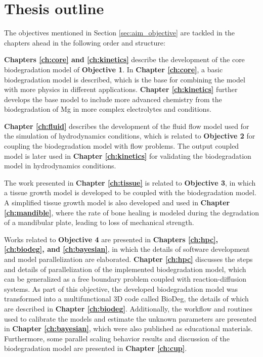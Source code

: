 \section{Thesis outline}

The objectives mentioned in Section \ref{sec:aim_objective} are tackled in the chapters ahead in the following order and structure:

\textbf{Chapters \ref{ch:core} and \ref{ch:kinetics}} describe the development of the core biodegradation model of \textbf{Objective 1}. In \textbf{Chapter \ref{ch:core}}, a basic biodegradation model is described, which is the base for combining the model with more physics in different applications. \textbf{Chapter \ref{ch:kinetics}} further develops the base model to include more advanced chemistry from the biodegradation of Mg in more complex electrolytes and conditions.

\textbf{Chapter \ref{ch:fluid}} describes the development of the fluid flow model used for the simulation of hydrodynamics conditions, which is related to \textbf{Objective 2} for coupling the biodegradation model with flow problems. The output coupled model is later used in \textbf{Chapter \ref{ch:kinetics}} for validating the biodegradation model in hydrodynamics conditions.

The work presented in \textbf{Chapter \ref{ch:tissue}} is related to \textbf{Objective 3}, in which a tissue growth model is developed to be coupled with the biodegradation model. A simplified tissue growth model is also developed and used in \textbf{Chapter \ref{ch:mandible}}, where the rate of bone healing is modeled during the degradation of a mandibular plate, leading to loss of mechanical strength.

Works related to \textbf{Objective 4} are presented in \textbf{Chapters \ref{ch:hpc}, \ref{ch:biodeg}, and \ref{ch:bayesian}}, in which the details of software development and model parallelization are elaborated. \textbf{Chapter \ref{ch:hpc}} discusses the steps and details of parallelization of the implemented biodegradation model, which can be generalized as a free boundary problem coupled with reaction-diffusion systems. As part of this objective, the developed biodegradation model was transformed into a multifunctional 3D code called BioDeg, the details of which are described in \textbf{Chapter \ref{ch:biodeg}}. Additionally, the workflow and routines used to calibrate the models and estimate the unknown parameters are presented in \textbf{Chapter \ref{ch:bayesian}}, which were also published as educational materials. Furthermore, some parallel scaling behavior results and discussion of the biodegradation model are presented in \textbf{Chapter \ref{ch:cup}}.

